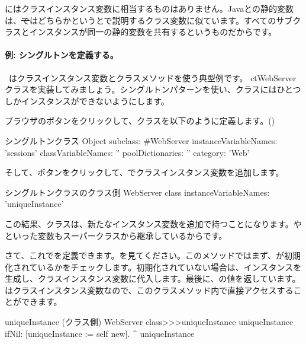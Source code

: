 \documentclass[a4paper,10pt,twoside]{book}
\begin{document}
にはクラスインスタンス変数に相当するものはありません。Javaとの静的変数は、\st ではどちらかというとで説明するクラス変数に似ています。すべてのサブクラスとインスタンスが同一の静的変数を共有するというものだからです。

\paragraph{例: シングルトンを定義する。}
~\cite{Alpe98a}はクラスインスタンス変数とクラスメソッドを使う典型例です。 ct{WebServer}クラスを実装してみましょう。シングルトンパターンを使い、クラスにはひとつしかインスタンスができないようにします。

ブラウザのボタンをクリックして、クラスを以下のように定義します。()

\begin{classdef}[singleton]{シングルトンクラス}
Object subclass: #WebServer
	instanceVariableNames: 'sessions' 	
	classVariableNames: '' 	
	poolDictionaries: '' 	
	category: 'Web'
\end{classdef}

そして、ボタンをクリックして、でクラスインスタンス変数を追加します。

\begin{classdef}[webserver]{シングルトンクラスのクラス側}
WebServer class 	
	instanceVariableNames: 'uniqueInstance'
\end{classdef}

この結果、クラスは、新たなインスタンス変数を追加で持つことになります。やといった変数もスーパークラスから継承しているからです。

さて、これでを定義できます。を見てください。このメソッドではまず、が初期化されているかをチェックします。初期化されていない場合は、インスタンスを生成し、クラスインスタンス変数に代入します。最後に、の値を返しています。はクラスインスタンス変数なので、このクラスメソッド内で直接アクセスすることができます。
    
\begin{method}[uniqueInstance]{uniqueInstance (クラス側)}
WebServer class>>>uniqueInstance
     uniqueInstance ifNil: [uniqueInstance := self new].
     ^ uniqueInstance
\end{method}
\end{document}
